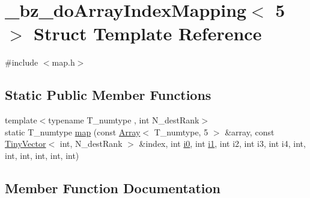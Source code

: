 \hypertarget{struct__bz__doArrayIndexMapping_3_015_01_4}{}\section{\+\_\+bz\+\_\+do\+Array\+Index\+Mapping$<$ 5 $>$ Struct Template Reference}
\label{struct__bz__doArrayIndexMapping_3_015_01_4}


{\ttfamily \#include $<$map.\+h$>$}

\subsection*{Static Public Member Functions}
\begin{DoxyCompactItemize}
\item 
{\footnotesize template$<$typename T\+\_\+numtype , int N\+\_\+dest\+Rank$>$ }\\static T\+\_\+numtype \hyperlink{struct__bz__doArrayIndexMapping_3_015_01_4_ae15695f5080c02c9e189e87cc0e64405}{map} (const \hyperlink{classArray}{Array}$<$ T\+\_\+numtype, 5 $>$ \&array, const \hyperlink{classTinyVector}{Tiny\+Vector}$<$ int, N\+\_\+dest\+Rank $>$ \&index, int \hyperlink{cephes_8h_aacd2643d920288e61be16787561a4514}{i0}, int \hyperlink{cephes_8h_ab24474d03df1f9adf1700c2c1badd1a5}{i1}, int i2, int i3, int i4, int, int, int, int, int, int)
\end{DoxyCompactItemize}


\subsection{Member Function Documentation}
\hypertarget{struct__bz__doArrayIndexMapping_3_015_01_4_ae15695f5080c02c9e189e87cc0e64405}{}

